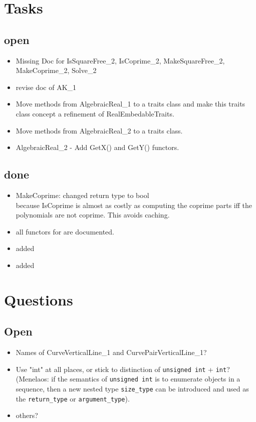 
\section{Tasks}

\subsection{open}
\begin{itemize}
\item Missing Doc for IsSquareFree\_2, IsCoprime\_2, MakeSquareFree\_2,
   MakeCoprime\_2, Solve\_2
\item revise doc of AK\_1 
\item Move methods from AlgebraicReal\_1 to a traits class and make
  this traits class concept a refinement of RealEmbedableTraits.
\item Move methods from AlgebraicReal\_2 to a traits class.
\item AlgebraicReal\_2 - Add GetX() and GetY() functors.
\end{itemize}

\subsection{done} 
\begin{itemize}
\item MakeCoprime: changed return type to bool\\
      because IsCoprime is almost as costly as computing the coprime parts iff the polynomials are not coprime. This avoids caching. 
\item all functors for  
      are documented.
\item added 
\item added  
\end{itemize}


\section{Questions}
\subsection{Open}
\begin{itemize}
 \item Names of CurveVerticalLine\_1 and CurvePairVerticalLine\_1?
 \item Use "int" at all places, or stick to distinction of \texttt{unsigned
   int} + \texttt{int}?
   (Menelaos: if the semantics of \texttt{unsigned int} is to enumerate
   objects in a sequence, then a new nested type \texttt{size\_type}
   can be introduced and used as the \texttt{return\_type} or
   \texttt{argument\_type}).
 \item others?
\end{itemize}


